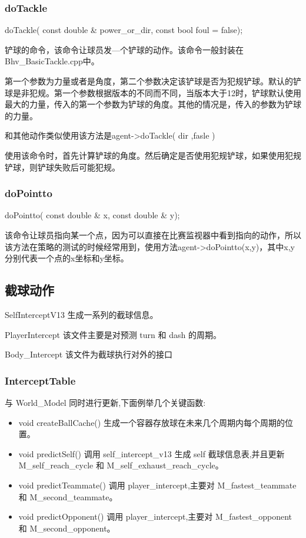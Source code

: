 \subsubsection{doTackle}
\begin{Code}
	doTackle( const double & power_or_dir, const bool foul = false);
\end{Code}

铲球的命令，该命令让球员发—个铲球的动作。该命令一般封装在Bhv_BasicTackle.cpp中。

第一个参数为力量或者是角度，第二个参数决定该铲球是否为犯规铲球。默认的铲球是非犯规。第一个参数根据版本的不同而不同，当版本大于12时，铲球默认使用最大的力量，传入的第一个参数为铲球的角度。其他的情况是，传入的参数为铲球的力量。

和其他动作类似使用该方法是agent->doTackle( dir ,fasle )

使用该命令时，首先计算铲球的角度。然后确定是否使用犯规铲球，如果使用犯规铲球，则铲球失败后可能犯规。

\subsubsection{doPointto}
\begin{Code}
doPointto( const double & x, const double & y);
\end{Code}


该命令让球员指向某一个点，因为可以直接在比赛监视器中看到指向的动作，所以该方法在策略的测试的时候经常用到，使用方法agent->doPointto(x,y)，其中x,y分别代表一个点的x坐标和y坐标。 


\subsection{截球动作}

SelfInterceptV13 	生成一系列的截球信息。

PlayerIntercept 	该文件主要是对预测 turn 和 dash 的周期。

Body_Intercept 		该文件为截球执行对外的接口

\subsubsection{InterceptTable}
与 World_Model 同时进行更新,下面例举几个关键函数:
\begin{itemize}
\item void createBallCache() 生成一个容器存放球在未来几个周期内每个周期的位置。
\item void predictSelf() 调用 self_intercept_v13 生成 self 截球信息表,并且更新 M_self_reach_cycle 和 M_self_exhaust_reach_cycle。
\item void predictTeammate() 调用 player_intercept,主要对 M_fastest_teammate 和 M_second_teammate。
\item void predictOpponent() 调用 player_intercept,主要对 M_fastest_opponent 和 M_second_opponent。
\end{itemize}



